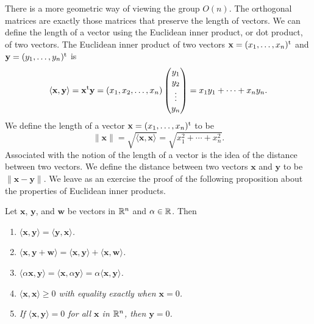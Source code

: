  
There is a more geometric way of viewing the group $O(n)$. The
orthogonal matrices are exactly those matrices that preserve the
length of vectors. We can define the length of a vector using the
{\bfi Euclidean inner product}, or
{\bfi dot product}, of two vectors. The Euclidean inner product of
two vectors ${\mathbf x}=(x_1, \ldots, x_n)^{\rm t}$ and ${\mathbf
y}=(y_1, \ldots, y_n)^{\rm t}$ is
\[
\langle  {\mathbf x}, {\mathbf y} \rangle
=
{\mathbf x}^{\rm t}  {\mathbf y}
=
(x_1, x_2, \ldots, x_n)
\begin{pmatrix}
y_1 \\ y_2 \\ \vdots \\ y_n
\end{pmatrix}
=
x_1 y_1 + \cdots + x_n y_n.
\]
We define the length of a vector ${\mathbf x}=(x_1, \ldots, x_n)^{\rm
t}$ to be 
\[
\| {\mathbf x} \|\label{notelengthvect} 
= \sqrt{\langle  {\mathbf x}, {\mathbf x} \rangle} 
= \sqrt{x_1^2 + \cdots + x_n^2}.
\]
Associated with the notion of the length of a vector is the idea of
the distance between two vectors. We define the {\bfi distance\/}
between two vectors ${\mathbf x}$ and ${\mathbf y}$ to be $\| {\mathbf
x}-{\mathbf y} \|$. We leave as an exercise the proof of the following
proposition about the properties of Euclidean inner products.  
 
 
\begin{proposition}
Let ${\mathbf x}$, ${\mathbf y}$, and ${\mathbf w}$ be vectors in ${\Bbb
R}^n$ and $\alpha \in {\Bbb R}$. Then 
\begin{enumerate}
 
\rm \item \it
$\langle {\mathbf x}, {\mathbf y} \rangle = \langle {\mathbf y}, {\mathbf x}
\rangle$. 
 
\rm \item \it
$\langle {\mathbf x}, {\mathbf y} + {\mathbf w} \rangle = \langle {\mathbf x},
{\mathbf y} \rangle + \langle {\mathbf x}, {\mathbf w} \rangle$.
 
\rm \item \it
$\langle \alpha {\mathbf x}, {\mathbf y} \rangle = \langle {\mathbf x},
\alpha {\mathbf y} \rangle = \alpha \langle  {\mathbf x}, {\mathbf y}
\rangle$. 
 
\rm \item \it
$\langle {\mathbf x}, {\mathbf x} \rangle \geq 0$ with equality exactly
when ${\mathbf x} = 0$. 
 
\rm \item \it
If $\langle {\mathbf x}, {\mathbf y} \rangle = 0$  for all ${\mathbf x}$ in
${\Bbb R}^n$, then ${\mathbf y} = 0$. 
 
\end{enumerate}
\end{proposition}
 
